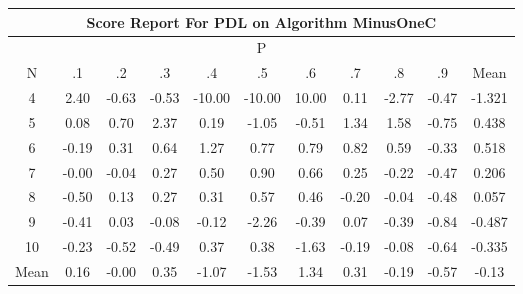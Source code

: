 \documentclass[11pt,a4paper]{report}
\begin{document}
\begin{longtable}{ | c || c | c | c | c | c | c | c | c | c || c |}
\hline
\multicolumn{11}{|c|}{ Score Report For PDL on Algorithm MinusOneC} \\
\hline
\multicolumn{11}{|c|}{ P } \\
\hline
N & .1 & .2 & .3 & .4 & .5 & .6 & .7 & .8 & .9 & Mean\\
 \hline
 \hline
 \endhead
  4 &  \cellcolor[HTML]{BFBFFF} 2.40 &  \cellcolor[HTML]{FFEFEF} -0.63 &  \cellcolor[HTML]{FFEFEF} -0.53 &  \cellcolor[HTML]{FF0000} -10.00 &  \cellcolor[HTML]{FF0000} -10.00 &  \cellcolor[HTML]{0808FF} 10.00 &  \cellcolor[HTML]{FFFFFF} 0.11 &  \cellcolor[HTML]{FFB7B7} -2.77 &  \cellcolor[HTML]{FFF7F7} -0.47 & -1.321 \\
  5 &  \cellcolor[HTML]{FFFFFF} 0.08 &  \cellcolor[HTML]{EFEFFF} 0.70 &  \cellcolor[HTML]{C7C7FF} 2.37 &  \cellcolor[HTML]{F7F7FF} 0.19 &  \cellcolor[HTML]{FFE7E7} -1.05 &  \cellcolor[HTML]{FFEFEF} -0.51 &  \cellcolor[HTML]{DFDFFF} 1.34 &  \cellcolor[HTML]{D7D7FF} 1.58 &  \cellcolor[HTML]{FFEFEF} -0.75 & 0.438 \\
  6 &  \cellcolor[HTML]{FFF7F7} -0.19 &  \cellcolor[HTML]{F7F7FF} 0.31 &  \cellcolor[HTML]{EFEFFF} 0.64 &  \cellcolor[HTML]{DFDFFF} 1.27 &  \cellcolor[HTML]{EFEFFF} 0.77 &  \cellcolor[HTML]{EFEFFF} 0.79 &  \cellcolor[HTML]{E7E7FF} 0.82 &  \cellcolor[HTML]{EFEFFF} 0.59 &  \cellcolor[HTML]{FFF7F7} -0.33 & 0.518 \\
  7 &  \cellcolor[HTML]{FFFFFF} -0.00 &  \cellcolor[HTML]{FFFFFF} -0.04 &  \cellcolor[HTML]{F7F7FF} 0.27 &  \cellcolor[HTML]{EFEFFF} 0.50 &  \cellcolor[HTML]{E7E7FF} 0.90 &  \cellcolor[HTML]{EFEFFF} 0.66 &  \cellcolor[HTML]{F7F7FF} 0.25 &  \cellcolor[HTML]{FFF7F7} -0.22 &  \cellcolor[HTML]{FFF7F7} -0.47 & 0.206 \\
  8 &  \cellcolor[HTML]{FFEFEF} -0.50 &  \cellcolor[HTML]{FFFFFF} 0.13 &  \cellcolor[HTML]{F7F7FF} 0.27 &  \cellcolor[HTML]{F7F7FF} 0.31 &  \cellcolor[HTML]{EFEFFF} 0.57 &  \cellcolor[HTML]{F7F7FF} 0.46 &  \cellcolor[HTML]{FFF7F7} -0.20 &  \cellcolor[HTML]{FFFFFF} -0.04 &  \cellcolor[HTML]{FFEFEF} -0.48 & 0.057 \\
  9 &  \cellcolor[HTML]{FFF7F7} -0.41 &  \cellcolor[HTML]{FFFFFF} 0.03 &  \cellcolor[HTML]{FFFFFF} -0.08 &  \cellcolor[HTML]{FFFFFF} -0.12 &  \cellcolor[HTML]{FFC7C7} -2.26 &  \cellcolor[HTML]{FFF7F7} -0.39 &  \cellcolor[HTML]{FFFFFF} 0.07 &  \cellcolor[HTML]{FFF7F7} -0.39 &  \cellcolor[HTML]{FFE7E7} -0.84 & -0.487 \\
  10 &  \cellcolor[HTML]{FFF7F7} -0.23 &  \cellcolor[HTML]{FFEFEF} -0.52 &  \cellcolor[HTML]{FFEFEF} -0.49 &  \cellcolor[HTML]{F7F7FF} 0.37 &  \cellcolor[HTML]{F7F7FF} 0.38 &  \cellcolor[HTML]{FFD7D7} -1.63 &  \cellcolor[HTML]{FFF7F7} -0.19 &  \cellcolor[HTML]{FFFFFF} -0.08 &  \cellcolor[HTML]{FFEFEF} -0.64 & -0.335 \\
 \hline
 \hline
Mean &  \cellcolor[HTML]{F7F7FF} 0.16 &  \cellcolor[HTML]{FFFFFF} -0.00 &  \cellcolor[HTML]{F7F7FF} 0.35 &  \cellcolor[HTML]{FFE7E7} -1.07 &  \cellcolor[HTML]{FFD7D7} -1.53 &  \cellcolor[HTML]{DFDFFF} 1.34 &  \cellcolor[HTML]{F7F7FF} 0.31 &  \cellcolor[HTML]{FFF7F7} -0.19 &  \cellcolor[HTML]{FFEFEF} -0.57 &  \cellcolor[HTML]{FFFFFF} -0.13
\end{longtable}
\end{document}
